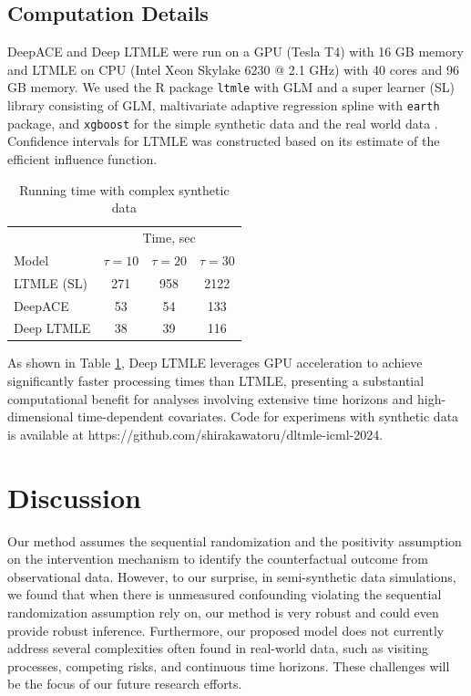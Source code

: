 \documentclass{article}
\theoremstyle{plain}
\theoremstyle{definition}
\theoremstyle{remark}
\begin{document}
\subsection{Computation Details}
DeepACE and Deep LTMLE were run on a GPU (Tesla T4) with 16 GB memory and LTMLE on CPU (Intel Xeon Skylake 6230 @ 2.1 GHz) with 40 cores and 96 GB memory. We used the R package \texttt{ltmle} with GLM and a super learner (SL) library consisting of GLM, maltivariate adaptive regression spline with \texttt{earth} package, and \texttt{xgboost} for the simple synthetic data and the real world data \cite{ltmle_rpackage, superlearner_rpackage, earth_rpackage, xgboost_rpackage}. Confidence intervals for LTMLE was constructed based on its estimate of the efficient influence function. 

\begin{table}[ht]
\centering
\caption{Running time with complex synthetic data}
\label{tableTime2}
    \begin{tabular}{lccc}
    \toprule
     & \multicolumn{3}{c}{Time, sec} \\
    Model & $\tau = 10$ & $\tau = 20$ & $\tau = 30$ \\
    \midrule
    LTMLE (SL) & 271 & 958 & 2122 \\
    DeepACE & 53 & 54 & 133 \\
    Deep LTMLE & 38 & 39 & 116 \\
    \bottomrule
    \end{tabular}
\end{table}

As shown in Table \ref{tableTime2}, Deep LTMLE leverages GPU acceleration to achieve significantly faster processing times than LTMLE, presenting a substantial computational benefit for analyses involving extensive time horizons and high-dimensional time-dependent covariates. Code for experimens with synthetic data is available at https://github.com/shirakawatoru/dltmle-icml-2024.

\section{Discussion}

Our method assumes the sequential randomization and the positivity assumption on the intervention mechanism to identify the counterfactual outcome from observational data. However, to our surprise, in semi-synthetic data simulations, we found that when there is unmeasured confounding violating the sequential randomization assumption rely on, our method is very robust and could even provide robust inference. Furthermore, our proposed model does not currently address several complexities often found in real-world data, such as visiting processes, competing risks, and continuous time horizons. These challenges will be the focus of our future research efforts.
\end{document}
